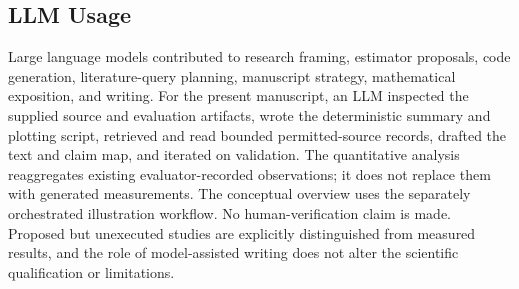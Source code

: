 \documentclass{article}
\begin{document}
\subsection{LLM Usage}
Large language models contributed to research framing, estimator proposals, code generation, literature-query planning, manuscript strategy, mathematical exposition, and writing. For the present manuscript, an LLM inspected the supplied source and evaluation artifacts, wrote the deterministic summary and plotting script, retrieved and read bounded permitted-source records, drafted the text and claim map, and iterated on validation. The quantitative analysis reaggregates existing evaluator-recorded observations; it does not replace them with generated measurements. The conceptual overview uses the separately orchestrated illustration workflow. No human-verification claim is made. Proposed but unexecuted studies are explicitly distinguished from measured results, and the role of model-assisted writing does not alter the scientific qualification or limitations.
\end{document}

